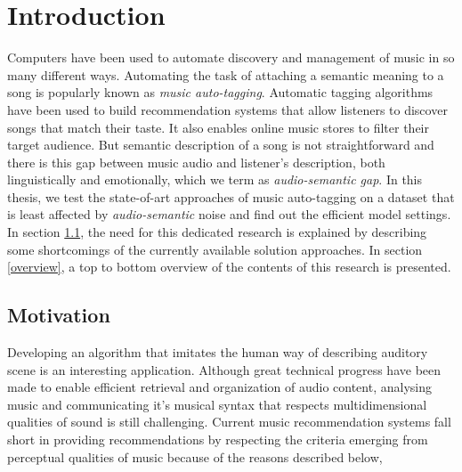 

\chapter{Introduction} %

\label{Chapter1} %


\newcommand{\keyword}[1]{\textbf{#1}}
\newcommand{\tabhead}[1]{\textbf{#1}}
\newcommand{\code}[1]{\texttt{#1}}
\newcommand{\file}[1]{\texttt{\bfseries#1}}
\newcommand{\option}[1]{\texttt{\itshape#1}}



Computers have been used to automate discovery and management of music in so many different ways. Automating the task of attaching a semantic meaning to a song is popularly known as \textit{music auto-tagging}. Automatic tagging algorithms have been used to build recommendation systems that allow listeners to discover songs that match their taste. It also enables online music stores to filter their target audience. But semantic description of a song is not straightforward and there is this gap between music audio and listener's description, both linguistically and emotionally, which we term as \textit{audio-semantic gap}. In this thesis, we test the state-of-art approaches of music auto-tagging on a dataset that is least affected by \textit{audio-semantic} noise and find out the efficient model settings. In section \ref{motivation}, the need for this dedicated research is explained by describing some shortcomings of the currently available solution approaches. In section \ref{overview}, a top to bottom overview of the contents of this research is presented.   


\section{Motivation}
\label{motivation}
Developing an algorithm that imitates the human way of describing auditory scene is an interesting application. Although great technical progress have been made to enable efficient retrieval and organization of audio content, analysing music and communicating it's musical syntax that respects multidimensional qualities of sound is still challenging. Current music recommendation systems fall short in providing recommendations by respecting the criteria emerging from perceptual qualities of music because of the reasons described below,
  
